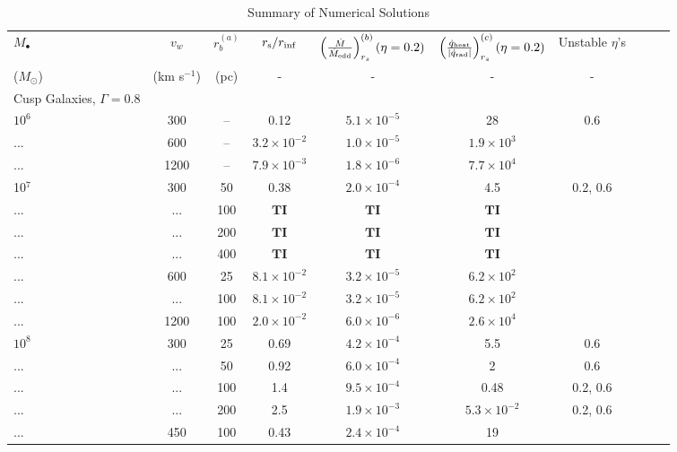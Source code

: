 \documentclass[usenatbib,fleqn]{mn2e}
\begin{document}
\begin{table}
\begin{threeparttable}
\begin{minipage}{18cm}
  \caption{Summary of Numerical Solutions}
\begin{tabular}{lccccccccc}
  \hline
  {$M_{\bullet}$} & {$v_{w}$} & {$r_b^{(a)}$} &   $r_{\rm s}/r_{\rm
    inf}$ &  {$\left(\frac{\dot{M}}{\dot{M}_{\rm edd}}\right)_{r_{s}}^{(b)}
      (\eta=0.2)$} & {$\left(\frac{\dot{q}_{\rm heat}}{|\dot{q}_{\rm
            rad}|}\right)_{r_s}^{(c)} (\eta=0.2)$} & Unstable $\eta$'s  \\
    ($M_{\odot}$) & (km s$^{-1}$) & (pc) &- & - & - &  - & \\ 
    \hline
    Cusp Galaxies, $\Gamma = 0.8$ & & & & & & & & \\
    $    10^{ 6 }$ & 300 & -- & 0.12 & $ 5.1 \times 10^{ -5 }$ & 28 & 0.6\\
    ... & 600 & -- & $ 3.2 \times 10^{ -2 }$ & $ 1.0 \times 10^{ -5 }$ & $ 1.9 \times 10^{ 3 }$ \\
    ... & 1200 & -- & $ 7.9 \times 10^{ -3 }$ & $ 1.8 \times 10^{ -6 }$ & $ 7.7 \times 10^{ 4 }$ \\
   10$^{7}$ & 300 & 50 & 0.38 & $ 2.0 \times 10^{ -4 }$ & 4.5 & 0.2, 0.6\\
... & ... & 100 & $\mathbf{TI}$ & $\mathbf{TI}$ & $\mathbf{TI}$ \\
... & ... & 200 & $\mathbf{TI}$ & $\mathbf{TI}$ & $\mathbf{TI}$ \\
... & ... & 400 & $\mathbf{TI}$ & $\mathbf{TI}$ & $\mathbf{TI}$ \\
... & 600 & 25 & $ 8.1 \times 10^{ -2 }$ & $ 3.2 \times 10^{ -5 }$ & $ 6.2 \times 10^{ 2 }$ \\
... & ... & 100 & $ 8.1 \times 10^{ -2 }$ & $ 3.2 \times 10^{ -5 }$ & $ 6.2 \times 10^{ 2 }$ \\
... & 1200 & 100 & $ 2.0 \times 10^{ -2 }$ & $ 6.0 \times 10^{ -6 }$ & $ 2.6 \times 10^{ 4 }$ \\
$    10^{ 8 }$ & 300 & 25 & 0.69 & $ 4.2 \times 10^{ -4 }$ & 5.5 & 0.6\\
... & ... & 50 & 0.92 & $ 6.0 \times 10^{ -4 }$ & 2 & 0.6\\
 ... & ... & 100 & 1.4 & $ 9.5 \times 10^{ -4 }$ & 0.48 & 0.2, 0.6 \\
 ... & ... & 200 & 2.5 & $ 1.9 \times 10^{ -3 }$ & $5.3 \times  10^{
   -2 }$ & 0.2, 0.6  \\
... & 450 & 100 & 0.43 & $ 2.4 \times 10^{ -4 }$ & 19 \\

\end{tabular}
\end{minipage}
\end{threeparttable}
\end{table}
\end{document}
